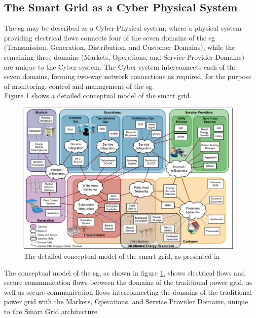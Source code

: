 \subsection{The Smart Grid as a Cyber Physical System}

The \acrlong{sg} may be described as a Cyber-Physical system, where a physical system providing electrical flows connects four of the seven domains of the \acrshort{sg} (Transmission, Generation, Distribution, and Customer Domains), while the remaining three domains (Markets, Operations, and Service Provider Domains) are unique to the Cyber system. The Cyber system interconnects each of the seven domains, forming two-way network connections as required, for the purpose of monitoring, control and management of the \acrshort{sg}. \\







Figure \ref{fig:NIST-SmartGRID-Detailed-ConceptualModel} shows a detailed conceptual model of the smart grid.

\begin{figure}[ht]
\includegraphics[width=\linewidth]{figures/NIST-SmartGRID-Detailed-ConceptualModel.png}
\caption{The detailed conceptual model of the smart grid, as presented in \cite{greer2014nist}}
\label{fig:NIST-SmartGRID-Detailed-ConceptualModel}
\end{figure}







The conceptual model of the \acrshort{sg}, as shown in figure \ref{fig:NIST-SmartGRID-Detailed-ConceptualModel}, shows electrical flows and secure communication flows between the domains of the traditional power grid, as well as secure communication flows interconnecting the domains of the traditional power grid with the Markets, Operations, and Service Provider Domains, unique to the Smart Grid architecture.


